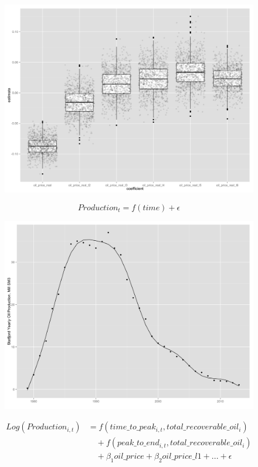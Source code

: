 \documentclass{beamer}
\begin{document}
\begin{frame}[plain]
	\begin{figure}
	\includegraphics[width=.8\textwidth]{glm_dirty_box.png}
	\caption{}
	\label{glm_dirty_box}
	\end{figure}
\end{frame}


\begin{frame}[plain]
	\begin{equation}
	Production_{t}=f(time) + \epsilon
		\label{simp_eqn}
	\end{equation}
\end{frame}


\begin{frame}[plain]
	\begin{figure}
		\includegraphics[width=.8\textwidth]{statfjord_gam.png}
		\caption{}
		\label{statfjord_gam}
	\end{figure}
\end{frame}


\begin{frame}[plain]

	\begin{equation}
	\begin{split}
		Log(Production_{i,t})&=f(time\_to\_peak_{i,t}, total\_recoverable\_oil_i) \\
		& \quad + f(peak\_to\_end_{i,t}, total\_recoverable\_oil_i) \\
		& \quad + \beta_1 oil\_price + \beta_2 oil\_price\_l1 + ... +  \epsilon
	\end{split}
	\label{gam_price_eqn}
	\end{equation}

\end{frame}
\end{document}
